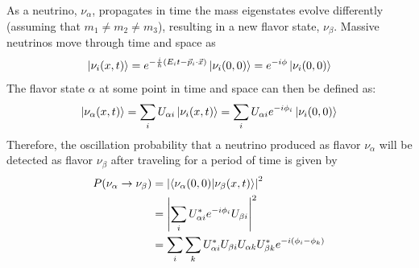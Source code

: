 As a neutrino, $\nu_\alpha$, propagates in time the mass eigenstates evolve differently (assuming that $m_{1} \neq m_{2} \neq m_{3}$), resulting in a new flavor state, $\nu_{\beta}$.
Massive neutrinos move through time and space as
\begin{equation}
	\ket{\nu_i(x,t)} = e^{-\frac{i}{\hbar}(E_{i}t-\vec{p}_{i}\cdot\vec{x})}\ket{\nu_i(0,0)} = e^{-i\phi}\ket{\nu_i(0,0)} 
\end{equation}
The flavor state $\alpha$ at some point in time and space can then be defined as:
\begin{equation}
	\ket{\nu_{\alpha}(x,t)} = \sum_{i}U_{\alpha i}\ket{\nu_{i}(x,t)} = \sum_{i}U_{\alpha i}e^{-i\phi_{i}}\ket{\nu_{i}(0,0)}
\end{equation}
Therefore, the oscillation probability that a neutrino produced as flavor $\nu_\alpha$ will be detected as flavor $\nu_\beta$ after traveling for a period of time is given by 
\begin{equation}	
\begin{split}
	P(\nu_\alpha \rightarrow \nu_\beta) &= \abs{\bra{\nu_\alpha(0,0)}\ket{\nu_\beta(x,t)}}^2 \\
	&=\abs{\sum_{i}U^{*}_{\alpha i}e^{-i\phi_i}U_{\beta i}}^2 \\
	&=\sum_{i}\sum_{k}U^{*}_{\alpha i}U_{\beta i}U_{\alpha k}U^{*}_{\beta k}e^{-i(\phi_{i}-\phi_{k})}
\end{split}
\end{equation}

